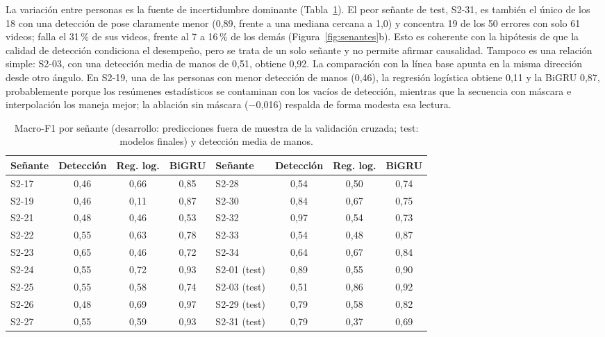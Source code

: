 \documentclass[11pt,a4paper]{article}
\begin{document}
La variación entre personas es la fuente de incertidumbre dominante (Tabla~\ref{tab:senantes}). El peor señante de test, S2-31, es también el único de los 18 con una detección de pose claramente menor (0,89, frente a una mediana cercana a 1,0) y concentra 19 de los 50 errores con solo 61 videos; falla el 31\,\% de sus videos, frente al 7 a 16\,\% de los demás (Figura~\ref{fig:senantes}b). Esto es coherente con la hipótesis de que la calidad de detección condiciona el desempeño, pero se trata de un solo señante y no permite afirmar causalidad. Tampoco es una relación simple: S2-03, con una detección media de manos de 0,51, obtiene 0,92. La comparación con la línea base apunta en la misma dirección desde otro ángulo. En S2-19, una de las personas con menor detección de manos (0,46), la regresión logística obtiene 0,11 y la BiGRU 0,87, probablemente porque los resúmenes estadísticos se contaminan con los vacíos de detección, mientras que la secuencia con máscara e interpolación los maneja mejor; la ablación sin máscara ($-$0,016) respalda de forma modesta esa lectura.

\begin{table}[htbp]
\centering
\caption{Macro-F1 por señante (desarrollo: predicciones fuera de muestra de la validación cruzada; test: modelos finales) y detección media de manos.}\label{tab:senantes}
\small
\renewcommand{\arraystretch}{1.08}
\begin{tabular}{@{}lccc@{\hspace{2.6em}}lccc@{}}
\toprule
\textbf{Señante} & \textbf{Detección} & \textbf{Reg. log.} & \textbf{BiGRU} & \textbf{Señante} & \textbf{Detección} & \textbf{Reg. log.} & \textbf{BiGRU}\\
\midrule
S2-17 & 0,46 & 0,66 & 0,85 & S2-28 & 0,54 & 0,50 & 0,74\\
S2-19 & 0,46 & 0,11 & 0,87 & S2-30 & 0,84 & 0,67 & 0,75\\
S2-21 & 0,48 & 0,46 & 0,53 & S2-32 & 0,97 & 0,54 & 0,73\\
S2-22 & 0,55 & 0,63 & 0,78 & S2-33 & 0,54 & 0,48 & 0,87\\
S2-23 & 0,65 & 0,46 & 0,72 & S2-34 & 0,64 & 0,67 & 0,84\\
S2-24 & 0,55 & 0,72 & 0,93 & S2-01 (test) & 0,89 & 0,55 & 0,90\\
S2-25 & 0,55 & 0,58 & 0,74 & S2-03 (test) & 0,51 & 0,86 & 0,92\\
S2-26 & 0,48 & 0,69 & 0,97 & S2-29 (test) & 0,79 & 0,58 & 0,82\\
S2-27 & 0,55 & 0,59 & 0,93 & S2-31 (test) & 0,79 & 0,37 & 0,69\\
\bottomrule
\end{tabular}
\end{table}
\end{document}
